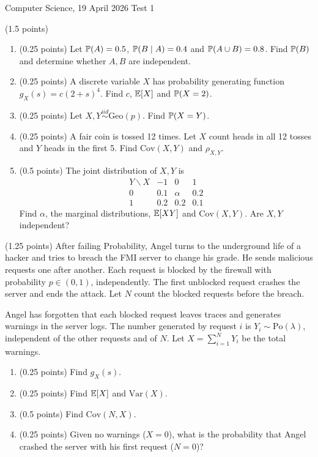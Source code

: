 \documentclass[a4paper]{report}
\begin{document}
\noindent Computer Science, 19 April 2026 \hfill Test 1
\vspace{0.5cm}
\begin{problem} (1.5 points)
\begin{enumerate}
\item (0.25 points) Let $\P(A)=0.5$, $\P(B\mid A)=0.4$ and $\P(A\cup B)=0.8$. Find $\P(B)$ and determine whether $A,B$ are independent.
\item (0.25 points) A discrete variable $X$ has probability generating function $g_X(s)=c(2+s)^4$. Find $c$, $\E[X]$ and $\P(X=2)$.
\item (0.25 points) Let $X,Y\overset{iid}{\sim}\mathrm{Geo}(p)$. Find $\P(X=Y)$.
\item (0.25 points) A fair coin is tossed 12 times. Let $X$ count heads in all 12 tosses and $Y$ heads in the first 5. Find $\mathrm{Cov}(X,Y)$ and $\rho_{X,Y}$.
\item (0.5 points) The joint distribution of $X,Y$ is
\[\begin{array}{c|ccc}Y\backslash X&-1&0&1\\\hline0&0.1&\alpha&0.2\\1&0.2&0.2&0.1\end{array}\]
Find $\alpha$, the marginal distributions, $\E[XY]$ and $\mathrm{Cov}(X,Y)$. Are $X,Y$ independent?
\end{enumerate}
\end{problem}
\begin{problem} (1.25 points)
After failing Probability, Angel turns to the underground life of a hacker and tries to breach the FMI server to change his grade. He sends malicious requests one after another. Each request is blocked by the firewall with probability $p\in(0,1)$, independently. The first unblocked request crashes the server and ends the attack. Let $N$ count the blocked requests before the breach.

Angel has forgotten that each blocked request leaves traces and generates warnings in the server logs. The number generated by request $i$ is $Y_i\sim\mathrm{Po}(\lambda)$, independent of the other requests and of $N$. Let $X=\sum_{i=1}^NY_i$ be the total warnings.
\begin{enumerate}
\item (0.25 points) Find $g_X(s)$.
\item (0.25 points) Find $\E[X]$ and $\mathrm{Var}(X)$.
\item (0.5 points) Find $\mathrm{Cov}(N,X)$.
\item (0.25 points) Given no warnings ($X=0$), what is the probability that Angel crashed the server with his first request ($N=0$)?
\end{enumerate}
\end{problem}
\end{document}
